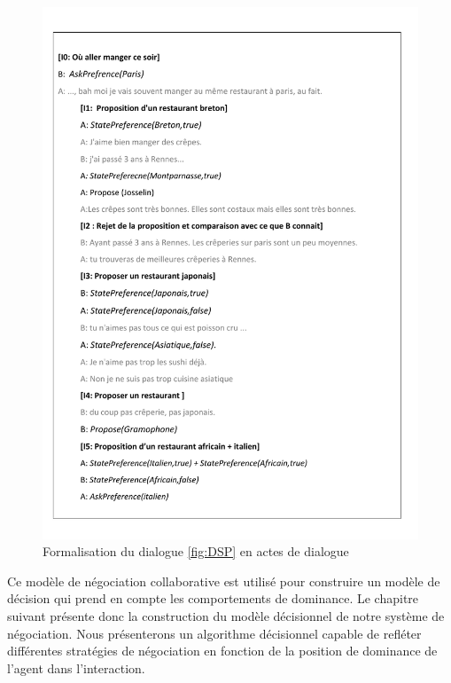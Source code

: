 \begin{figure}[t]
	\includegraphics[width=\linewidth, height=0.8\textheight]{Figures/natToUtt.pdf}
	\caption{\label{fig:natUtt} Formalisation du dialogue \ref{fig:DSP} en actes de dialogue}
	
\end{figure} 
Ce modèle de négociation collaborative est utilisé pour construire un modèle de décision qui prend en compte les comportements de dominance. Le chapitre suivant présente donc la construction du modèle décisionnel de notre système de négociation. Nous présenterons un algorithme décisionnel capable de refléter différentes stratégies de négociation en fonction de la position de dominance de l'agent dans l'interaction.



